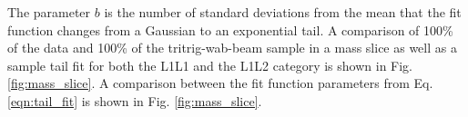 The parameter $b$ is the number of standard deviations from the mean that the fit function changes from a Gaussian to an exponential tail. %
A comparison of 100\% of the data and 100\% of the tritrig-wab-beam sample in a mass slice as well as a sample tail fit for both the L1L1 and the L1L2 category is shown in Fig. \ref{fig:mass_slice}. A comparison between the fit function parameters from Eq. \ref{eqn:tail_fit} is shown in Fig. \ref{fig:mass_slice}.

